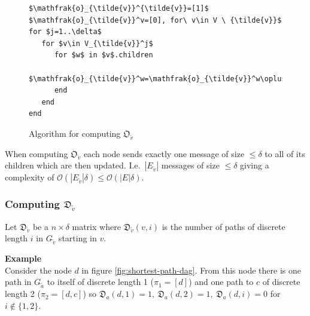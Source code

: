 \documentclass{article}
\begin{document}
\begin{figure}[H]
\begin{lstlisting}
$\mathfrak{o}_{\tilde{v}}^{\tilde{v}}=[1]$
$\mathfrak{o}_{\tilde{v}}^v=[0], for\ v\in V \ {\tilde{v}}$
for $j=1..\delta$
   for $v\in V_{\tilde{v}}^j$
      for $w$ in $v$.children
         $\mathfrak{o}_{\tilde{v}}^w=\mathfrak{o}_{\tilde{v}}^w\oplus[0,\mathfrak{o}_{\tilde{v}}^v]$
      end
   end
end
\end{lstlisting}
\caption{Algorithm for computing $\mathfrak{O}_{\tilde{v}}$}
\label{algorithm:o}
\end{figure}

When computing $\mathfrak{O}_{\tilde{v}}$ each node sends exactly one message of size $\leq \delta$ to all of its children which are then updated. I.e.\ $|E_{\tilde{v}}|$ messages of size $\leq \delta$ giving a complexity of $\mathcal{O}(|E_{\tilde{v}}|\delta) \leq \mathcal{O}(|E|\delta)$.

\subsubsection{Computing $\mathfrak{D}_{\tilde{v}}$}

Let $\mathfrak{D}_{\tilde{v}}$ be a $n\times\delta$ matrix where $\mathfrak{D}_{\tilde{v}}(v, i)$ is the number of paths of discrete length $i$ in $G_{\tilde{v}}$ starting in $v$.

\textbf{Example}\\
Consider the node $d$ in figure \ref{fig:shortest-path-dag}. From this node there is one path in $G_{\tilde{a}}$ to itself of discrete length 1 ($\pi_1=[d]$) and one path to $c$ of discrete length 2 ($\pi_2=[d,c]$) so $\mathfrak{D}_a(d,1)=1,\ \mathfrak{D}_a(d,2)=1,\ \mathfrak{D}_a(d,i)=0$ for $i\notin\{1,2\}$.
\end{document}
